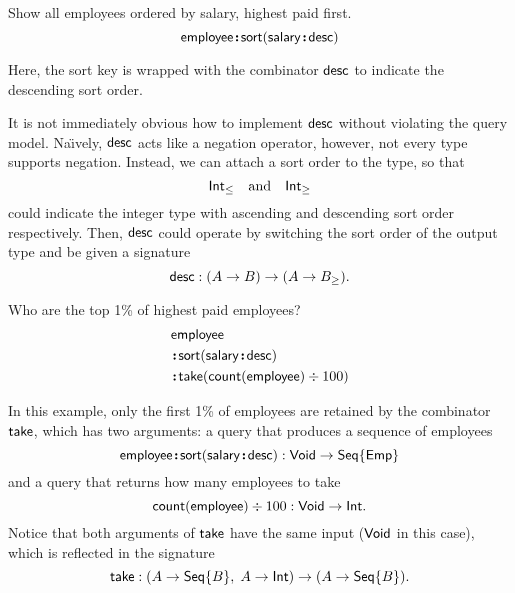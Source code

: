 \begin{demo}
    \label{ex:sort-employee-by-salary-desc}
    Show all employees ordered by salary, highest paid first.
    \begin{equation*}
        \mathsf{employee}\!\boldsymbol{:}\!\mathsf{sort}(\mathsf{salary}\!\boldsymbol{:}\!\mathsf{desc})
    \end{equation*}
\end{demo}

Here, the sort key is wrapped with the combinator $\mathsf{desc}$ to indicate the
descending sort order.

It is not immediately obvious how to implement $\mathsf{desc}$ without violating the
query model.  Na\"{\i}vely, $\mathsf{desc}$ acts like a negation operator, however, not
every type supports negation.  Instead, we can attach a sort order to the type,
so that
\begin{equation*}
    \mathsf{Int}_{\le} \quad\text{and}\quad \mathsf{Int}_{\ge}
\end{equation*}
could indicate the integer type with ascending and descending sort order
respectively.  Then, $\mathsf{desc}$ could operate by switching the sort order of the
output type and be given a signature
\begin{equation*}
    \mathsf{desc} : (A \to B) \to (A \to B_{\ge}).
\end{equation*}

\begin{demo}
    \label{ex:sort-employee-by-salary-take-top}
    Who are the top 1\% of highest paid employees?
    \begin{align*}
        & \mathsf{employee} \\
        & \!\boldsymbol{:}\!\mathsf{sort}(\mathsf{salary}\!\boldsymbol{:}\!\mathsf{desc}) \\
        & \!\boldsymbol{:}\!\mathsf{take}(\mathsf{count}(\mathsf{employee})\mathbin \div 100)
    \end{align*}
\end{demo}

In this example, only the first 1\% of employees are retained by the combinator
$\mathsf{take}$, which has two arguments: a query that produces a sequence of employees
\begin{equation*}
    \mathsf{employee}\!\boldsymbol{:}\!\mathsf{sort}(\mathsf{salary}\!\boldsymbol{:}\!\mathsf{desc}) : \mathsf{Void} \to \mathsf{Seq}{\left\{\mathsf{Emp}\right\}}
\end{equation*}
and a query that returns how many employees to take
\begin{equation*}
    \mathsf{count}(\mathsf{employee}) \div 100 : \mathsf{Void} \to \mathsf{Int}.
\end{equation*}
Notice that both arguments of $\mathsf{take}$ have the same input ($\mathsf{Void}$ in this
case), which is reflected in the signature
\begin{equation*}
    \mathsf{take} : (A \to \mathsf{Seq}{\left\{B\right\}},\; A \to \mathsf{Int}) \to (A \to \mathsf{Seq}{\left\{B\right\}}).
\end{equation*}

